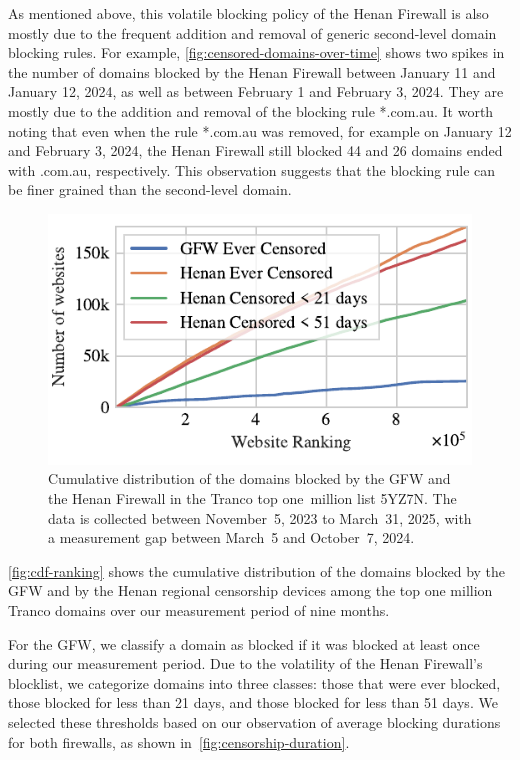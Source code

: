 \documentclass[conference,compsoc]{IEEEtran}
\begin{document}
As mentioned above,
this volatile blocking policy of the Henan Firewall is also mostly
due to the frequent addition and removal of generic second-level domain blocking rules.
For example,
\autoref{fig:censored-domains-over-time} shows
two spikes in the number of domains blocked by the Henan Firewall
between January 11 and January 12, 2024,
as well as between February 1 and February 3, 2024.
They are mostly due to the addition and removal of the blocking rule *.com.au.
It worth noting that even when the rule *.com.au was removed,
for example on January 12 and February 3, 2024,
the Henan Firewall still blocked 44 and 26 domains ended with .com.au, respectively.
This observation suggests that the blocking rule can be finer grained than the second-level domain.


\begin{figure}[t]
  \centering
  \includegraphics[width=\linewidth]{figures/cdf-ranking.pdf}
  \caption{
  Cumulative distribution of the domains blocked by the GFW and the Henan Firewall
  in the Tranco top one~million list 5YZ7N.
  The data is collected between November~5, 2023 to March~31, 2025,
  with a measurement gap between March~5 and October~7, 2024.
  }
  \label{fig:cdf-ranking}
\end{figure}

\autoref{fig:cdf-ranking} shows the cumulative distribution of the domains blocked by the GFW
and by the Henan regional censorship devices among the top one million Tranco domains over
our measurement period of nine months.

For the GFW, we classify a domain as blocked if it was blocked at least once
during our measurement period. Due to the volatility of the Henan Firewall's blocklist,
we categorize domains into three classes: those that were ever blocked,
those blocked for less than 21 days, and those blocked for less than 51 days.
We selected these thresholds based on our observation of average blocking durations
for both firewalls, as shown in~\autoref{fig:censorship-duration}.
\end{document}

